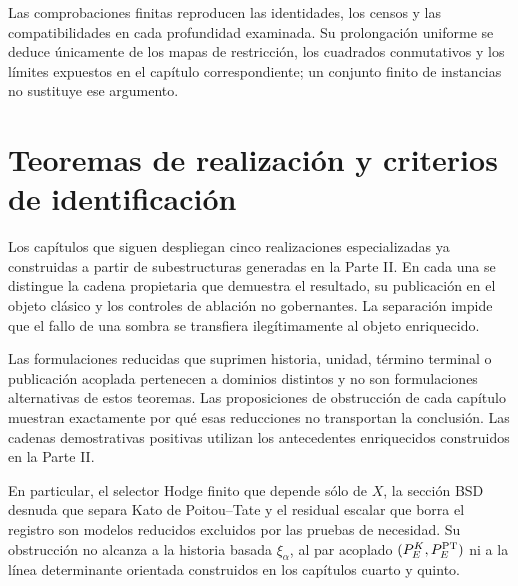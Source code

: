 Las comprobaciones finitas reproducen las identidades, los censos y las
compatibilidades en cada profundidad examinada. Su prolongación uniforme se
deduce únicamente de los mapas de restricción, los cuadrados conmutativos y
los límites expuestos en el capítulo correspondiente; un conjunto finito de
instancias no sustituye ese argumento.

\section*{Teoremas de realización y criterios de identificación}

Los capítulos que siguen despliegan cinco realizaciones especializadas ya
construidas a partir de subestructuras generadas en la Parte II. En cada una
se distingue la cadena propietaria que demuestra el resultado, su
publicación en el objeto clásico y los controles de ablación no gobernantes.
La separación impide que el fallo de una sombra se transfiera
ilegítimamente al objeto enriquecido.

Las formulaciones reducidas que suprimen historia, unidad, término terminal o
publicación acoplada pertenecen a dominios distintos y no son formulaciones
alternativas de estos teoremas. Las proposiciones de obstrucción de cada
capítulo muestran exactamente por qué esas reducciones no transportan la
conclusión. Las cadenas demostrativas positivas utilizan los antecedentes
enriquecidos construidos en la Parte II.

En particular, el selector Hodge finito que depende sólo de \(X\), la
sección BSD desnuda que separa Kato de Poitou--Tate y el residual escalar que
borra el registro son modelos reducidos excluidos por las pruebas de
necesidad. Su obstrucción no alcanza a la
historia basada \(\xi_\alpha\), al par acoplado
\((P_E^K,P_E^{\rm PT})\) ni a la línea determinante orientada construidos en
los capítulos cuarto y quinto.
